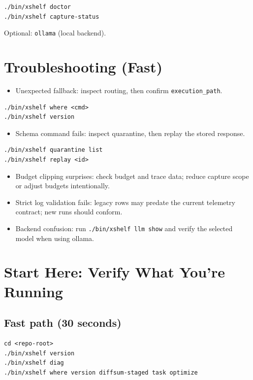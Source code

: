 \documentclass[11pt]{article}
\begin{document}
\begin{lstlisting}[style=cx]
./bin/xshelf doctor
./bin/xshelf capture-status
\end{lstlisting}
Optional: \texttt{ollama} (local backend).

\section*{Troubleshooting (Fast)}
\begin{itemize}
  \item Unexpected fallback: inspect routing, then confirm \texttt{execution\_path}.
\end{itemize}
\begin{lstlisting}[style=cx]
./bin/xshelf where <cmd>
./bin/xshelf version
\end{lstlisting}
\begin{itemize}
  \item Schema command fails: inspect quarantine, then replay the stored response.
\end{itemize}
\begin{lstlisting}[style=cx]
./bin/xshelf quarantine list
./bin/xshelf replay <id>
\end{lstlisting}
\begin{itemize}
  \item Budget clipping surprises: check budget and trace data; reduce capture scope or adjust budgets intentionally.
  \item Strict log validation fails: legacy rows may predate the current telemetry contract; new runs should conform.
  \item Backend confusion: run \texttt{./bin/xshelf llm show} and verify the selected model when using ollama.
\end{itemize}

\tableofcontents
\newpage

\section{Start Here: Verify What You’re Running}
\subsection*{Fast path (30 seconds)}
\begin{lstlisting}[style=cx]
cd <repo-root>
./bin/xshelf version
./bin/xshelf diag
./bin/xshelf where version diffsum-staged task optimize
\end{lstlisting}
\end{document}
